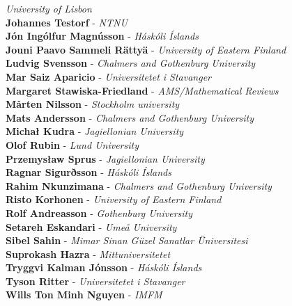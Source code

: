 \documentclass[12pt, openany, twoside]{report}      %
\begin{document}
\textit{University of Lisbon}
\\
\textbf{Johannes Testorf} -
\textit{NTNU}
\\
\textbf{Jón Ingólfur Magnússon} -
\textit{Háskóli Íslands}
\\
\textbf{Jouni Paavo Sammeli Rättyä} -
\textit{University of Eastern Finland}
\\
\textbf{Ludvig Svensson} -
\textit{Chalmers and Gothenburg University}
\\
\textbf{Mar Saiz Aparicio} -
\textit{Universitetet i Stavanger}
\\
\textbf{Margaret Stawiska-Friedland} -
\textit{AMS/Mathematical Reviews}
\\
\textbf{Mårten Nilsson} -
\textit{Stockholm university}
\\
\textbf{Mats Andersson} -
\textit{Chalmers and Gothenburg University}
\\
\textbf{Michał Kudra} -
\textit{Jagiellonian University}
\\
\textbf{Olof Rubin} -
\textit{Lund University}
\\
\textbf{Przemysław Sprus} -
\textit{Jagiellonian University}
\\
\textbf{Ragnar Sigurðsson} -
\textit{Háskóli Íslands}
\\
\textbf{Rahim Nkunzimana} -
\textit{Chalmers and Gothenburg University}
\\
\textbf{Risto Korhonen} -
\textit{University of Eastern Finland}
\\
\textbf{Rolf Andreasson} -
\textit{Gothenburg University}
\\
\textbf{Setareh Eskandari} -
\textit{Umeå University}
\\
\textbf{Sibel Sahin} -
\textit{Mimar Sinan Güzel Sanatlar Üniversitesi}
\\
\textbf{Suprokash Hazra} -
\textit{Mittuniversitetet}
\\
\textbf{Tryggvi Kalman Jónsson} -
\textit{Háskóli Íslands}
\\
\textbf{Tyson Ritter} -
\textit{Universitetet i Stavanger}
\\
\textbf{Wills Ton Minh Nguyen} -
\textit{IMFM}
\restoregeometry

\newpage
\end{document}
